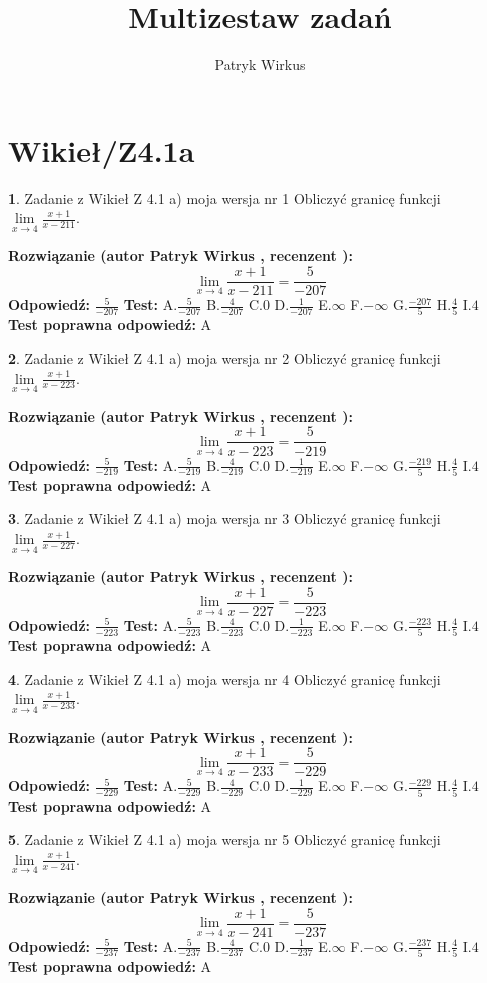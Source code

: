 \documentclass[12pt, a4paper]{article}
\title{Multizestaw zadań}
\author{Patryk Wirkus}
\date{}
\theoremstyle{definition} %
\newtheorem{zad}{}
\newcommand{\kategoria}[1]{\section{#1}}
\newcommand{\zadStart}[1]{\begin{zad}#1\newline}
\newcommand{\zadStop}{\end{zad}}
\newcommand{\rozwStart}[2]{\noindent \textbf{Rozwiązanie (autor #1 , recenzent #2): }\newline}
\newcommand{\rozwStop}{\newline}
\newcommand{\odpStart}{\noindent \textbf{Odpowiedź:}\newline}
\newcommand{\odpStop}{\newline}
\newcommand{\testStart}{\noindent \textbf{Test:}\newline}
\newcommand{\testStop}{\newline}
\newcommand{\kluczStart}{\noindent \textbf{Test poprawna odpowiedź:}\newline}
\newcommand{\kluczStop}{\newline}
\begin{document}
\maketitle

\kategoria{Wikieł/Z4.1a}


\zadStart{Zadanie z Wikieł Z 4.1 a) moja wersja nr 1}
Obliczyć granicę funkcji $\lim\limits_{x\to4}\frac{x+1}{x-211}$.
\zadStop
\rozwStart{Patryk Wirkus}{}
$$\lim\limits_{x\to4}\frac{x+1}{x-211} = \frac{5}{-207}$$
\rozwStop
\odpStart
$\frac{5}{-207}$
\odpStop
\testStart
A.$\frac{5}{-207}$
B.$\frac{4}{-207}$
C.$0$
D.$\frac{1}{-207}$
E.$\infty$
F.$-\infty$
G.$\frac{-207}{5}$
H.$\frac{4}{5}$
I.$4$
\testStop
\kluczStart
A
\kluczStop



\zadStart{Zadanie z Wikieł Z 4.1 a) moja wersja nr 2}
Obliczyć granicę funkcji $\lim\limits_{x\to4}\frac{x+1}{x-223}$.
\zadStop
\rozwStart{Patryk Wirkus}{}
$$\lim\limits_{x\to4}\frac{x+1}{x-223} = \frac{5}{-219}$$
\rozwStop
\odpStart
$\frac{5}{-219}$
\odpStop
\testStart
A.$\frac{5}{-219}$
B.$\frac{4}{-219}$
C.$0$
D.$\frac{1}{-219}$
E.$\infty$
F.$-\infty$
G.$\frac{-219}{5}$
H.$\frac{4}{5}$
I.$4$
\testStop
\kluczStart
A
\kluczStop



\zadStart{Zadanie z Wikieł Z 4.1 a) moja wersja nr 3}
Obliczyć granicę funkcji $\lim\limits_{x\to4}\frac{x+1}{x-227}$.
\zadStop
\rozwStart{Patryk Wirkus}{}
$$\lim\limits_{x\to4}\frac{x+1}{x-227} = \frac{5}{-223}$$
\rozwStop
\odpStart
$\frac{5}{-223}$
\odpStop
\testStart
A.$\frac{5}{-223}$
B.$\frac{4}{-223}$
C.$0$
D.$\frac{1}{-223}$
E.$\infty$
F.$-\infty$
G.$\frac{-223}{5}$
H.$\frac{4}{5}$
I.$4$
\testStop
\kluczStart
A
\kluczStop



\zadStart{Zadanie z Wikieł Z 4.1 a) moja wersja nr 4}
Obliczyć granicę funkcji $\lim\limits_{x\to4}\frac{x+1}{x-233}$.
\zadStop
\rozwStart{Patryk Wirkus}{}
$$\lim\limits_{x\to4}\frac{x+1}{x-233} = \frac{5}{-229}$$
\rozwStop
\odpStart
$\frac{5}{-229}$
\odpStop
\testStart
A.$\frac{5}{-229}$
B.$\frac{4}{-229}$
C.$0$
D.$\frac{1}{-229}$
E.$\infty$
F.$-\infty$
G.$\frac{-229}{5}$
H.$\frac{4}{5}$
I.$4$
\testStop
\kluczStart
A
\kluczStop



\zadStart{Zadanie z Wikieł Z 4.1 a) moja wersja nr 5}
Obliczyć granicę funkcji $\lim\limits_{x\to4}\frac{x+1}{x-241}$.
\zadStop
\rozwStart{Patryk Wirkus}{}
$$\lim\limits_{x\to4}\frac{x+1}{x-241} = \frac{5}{-237}$$
\rozwStop
\odpStart
$\frac{5}{-237}$
\odpStop
\testStart
A.$\frac{5}{-237}$
B.$\frac{4}{-237}$
C.$0$
D.$\frac{1}{-237}$
E.$\infty$
F.$-\infty$
G.$\frac{-237}{5}$
H.$\frac{4}{5}$
I.$4$
\testStop
\kluczStart
A
\kluczStop
\end{document}
